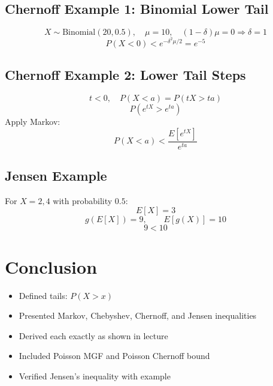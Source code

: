 \documentclass[11pt]{article}
\begin{document}
\subsection*{Chernoff Example 1: Binomial Lower Tail}

\[
X\sim \text{Binomial}(20,0.5),\quad \mu=10,\quad (1-\delta)\mu = 0 \Rightarrow \delta=1
\]
\[
P(X<0) < e^{-\delta^2 \mu / 2} = e^{-5}
\]

\subsection*{Chernoff Example 2: Lower Tail Steps}

\[
t<0,\quad P(X<a) = P(tX > ta)
\]
\[
P(e^{tX} > e^{ta})
\]
Apply Markov:
\[
P(X<a) < \frac{E[e^{tX}]}{e^{ta}}
\]

\subsection*{Jensen Example}

For $X=2,4$ with probability $0.5$:
\[
E[X]=3
\]
\[
g(E[X]) = 9,\qquad E[g(X)] = 10
\]
\[
9 < 10
\]

\section{Conclusion}

\begin{itemize}
    \item Defined tails: $P(X>x)$
    \item Presented Markov, Chebyshev, Chernoff, and Jensen inequalities
    \item Derived each exactly as shown in lecture
    \item Included Poisson MGF and Poisson Chernoff bound
    \item Verified Jensen's inequality with example
\end{itemize}
\end{document}

